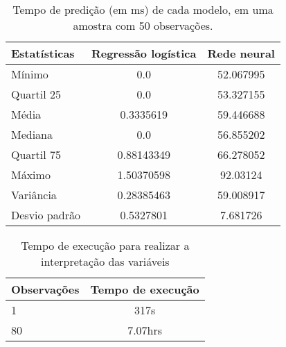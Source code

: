 \begin{table}[H]
\centering
\begin{tabular}{lcc}
  \hline
  \textbf{Estatísticas} & \textbf{Regressão logística} & \textbf{Rede neural} \\
  \hline
  Mínimo & 0.0 & 52.067995 \\
  Quartil 25 & 0.0 & 53.327155 \\
  Média & 0.3335619 & 59.446688 \\
  Mediana & 0.0 & 56.855202 \\
  Quartil 75 & 0.88143349 & 66.278052 \\
  Máximo & 1.50370598 & 92.03124 \\
  Variância & 0.28385463 & 59.008917 \\
  Desvio padrão & 0.5327801 & 7.681726 \\
  \hline
\end{tabular}
\caption{Tempo de predição (em ms) de cada modelo, em uma amostra com 50 observações. }
\label{tab:bench_models}
\end{table}



\begin{table}[H]
\centering
\begin{tabular}{lc}
\hline
\textbf{Observações} & \textbf{Tempo de execução} \\
\hline
1  & 317s \\
80 & 7.07hrs \\
\hline
\end{tabular}
\caption{Tempo de execução para realizar a interpretação das variáveis}
\label{tab:tempo_execucao_shap}
\end{table}
\newpage

